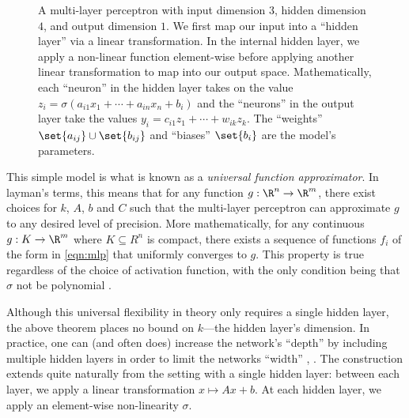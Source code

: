 \begin{figure}[h]
	\centering

	\caption{A multi-layer perceptron with input dimension $3$, hidden dimension $4$, and output dimension $1$. We first map our input into a ``hidden layer'' via a linear transformation. In the internal hidden layer, we apply a non-linear function element-wise before applying another linear transformation to map into our output space. Mathematically, each ``neuron'' in the hidden layer takes on the value $z_i = \sigma(a_{i1} x_1 + \cdots + a_{in} x_n + b_i)$ and the ``neurons'' in the output layer take the values $y_i = c_{i1} z_1 + \cdots + w_{ik} z_k$. The ``weights'' $\set{a_{ij}} \cup \set{b_{ij}}$ and ``biases'' $\set{b_i}$ are the model's parameters.}
	\label{fig:mlp-diagram}
\end{figure}

This simple model is what is known as a \emph{universal function approximator}. In layman's terms, this means that for any function $g : \R^n \to \R^m$, there exist choices for $k$, $A$, $b$ and $C$ such that the multi-layer perceptron can approximate $g$ to any desired level of precision. More mathematically, for any continuous $g : K \to \R^m$ where $K \subseteq R^n$ is compact, there exists a sequence of functions $f_i$ of the form in \autoref{eqn:mlp} that uniformly converges to $g$. This property is true regardless of the choice of activation function, with the only condition being that $\sigma$ not be polynomial \cite[\S 13.2.5]{PML}.

Although this universal flexibility in theory only requires a single hidden layer, the above theorem places no bound on $k$---the hidden layer's dimension. In practice, one can (and often does) increase the network's ``depth'' by including multiple hidden layers in order to limit the networks ``width'' \cite[\S 13.2.5]{PML}, \cite[10.2]{ISL}. The construction extends quite naturally from the setting with a single hidden layer: between each layer, we apply a linear transformation $x \mapsto Ax + b$. At each hidden layer, we apply an element-wise non-linearity $\sigma$.

